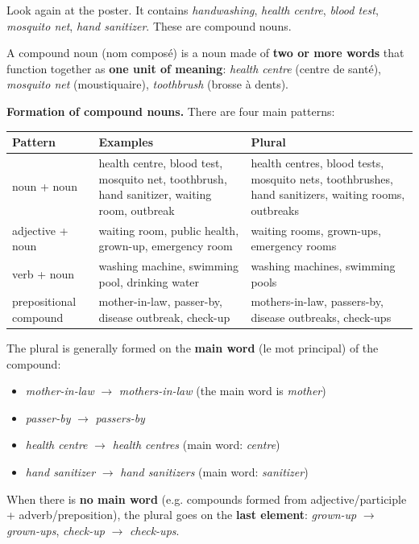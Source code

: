\documentclass[11pt]{article}
\newcommand{\cle}[1]{{\popxbold\color{popdark}#1}}
\newcounter{popsec}
\newcounter{popsub}
\newcommand{\courssub}[1]{%
  \stepcounter{popsub}%
  \par\vspace{9pt}\noindent{\popxbold\fontsize{11.5}{13}\selectfont\color{popink}{\color{poporange}\thepopsec.\thepopsub}\hspace{6pt}#1}\par\nopagebreak\vspace{4pt}
}
\begin{document}
\courssub{Grammar: compound nouns}

Look again at the poster. It contains \emph{handwashing}, \emph{health centre}, \emph{blood test}, \emph{mosquito net}, \emph{hand sanitizer}. These are \cle{compound nouns}.

\begin{definition}
A \cle{compound noun} (nom composé) is a noun made of \textbf{two or more words} that function together as \textbf{one unit of meaning}: \emph{health centre} (centre de santé), \emph{mosquito net} (moustiquaire), \emph{toothbrush} (brosse à dents).
\end{definition}

\textbf{Formation of compound nouns.} There are four main patterns:

\begin{center}
\begin{tabularx}{\linewidth}{|l|X|X|}\hline
\rowcolor{popblueL} \textbf{Pattern} & \textbf{Examples} & \textbf{Plural} \\ \hline
noun + noun & health centre, blood test, mosquito net, toothbrush, hand sanitizer, waiting room, outbreak & health centres, blood tests, mosquito nets, toothbrushes, hand sanitizers, waiting rooms, outbreaks \\ \hline
adjective + noun & waiting room, public health, grown-up, emergency room & waiting rooms, grown-ups, emergency rooms \\ \hline
verb + noun & washing machine, swimming pool, drinking water & washing machines, swimming pools \\ \hline
prepositional compound & mother-in-law, passer-by, disease outbreak, check-up & mothers-in-law, passers-by, disease outbreaks, check-ups \\ \hline
\end{tabularx}
\end{center}

\begin{propriete}
The plural is generally formed on the \textbf{main word} (le mot principal) of the compound:
\begin{itemize}
\item \emph{mother-in-law} $\rightarrow$ \emph{mothers-in-law} (the main word is \emph{mother})
\item \emph{passer-by} $\rightarrow$ \emph{passers-by}
\item \emph{health centre} $\rightarrow$ \emph{health centres} (main word: \emph{centre})
\item \emph{hand sanitizer} $\rightarrow$ \emph{hand sanitizers} (main word: \emph{sanitizer})
\end{itemize}
When there is \textbf{no main word} (e.g. compounds formed from adjective/participle + adverb/preposition), the plural goes on the \textbf{last element}: \emph{grown-up} $\rightarrow$ \emph{grown-ups}, \emph{check-up} $\rightarrow$ \emph{check-ups}.
\end{propriete}
\end{document}
